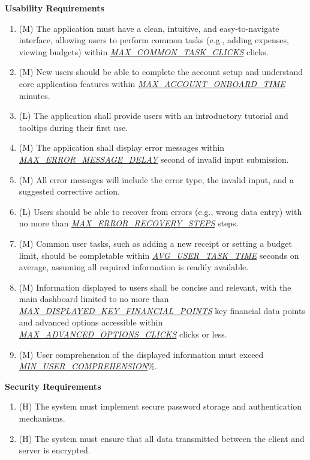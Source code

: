 \documentclass[12pt]{article}
\begin{document}
\textbf{Usability Requirements}
\begin{enumerate}[label=NFR-USAB-\arabic*]
  \item (M) The application must have a clean, intuitive, and easy-to-navigate
  interface, allowing users to perform common tasks (e.g., adding expenses,
  viewing budgets) within
  \hyperref[Table:AuxConstants]{\textit{MAX\_COMMON\_TASK\_CLICKS}} clicks.
  \item (M) New users should be able to complete the account setup and
  understand core application features within
  \hyperref[Table:AuxConstants]{\textit{MAX\_ACCOUNT\_ONBOARD\_TIME}} minutes.
  \item (L) The application shall provide users with an introductory tutorial and
  tooltips during their first use.
  \item (M) The application shall display error messages within
  \hyperref[Table:AuxConstants]{\textit{MAX\_ERROR\_MESSAGE\_DELAY}} second of
  invalid input submission.
  \item (M) All error messages will include the error type, the invalid 
  input, and a suggested corrective action.
  \item (L) Users should be able to recover from errors (e.g., wrong data entry)
  with no more than
  \hyperref[Table:AuxConstants]{\textit{MAX\_ERROR\_RECOVERY\_STEPS}} steps.
  \item (M) Common user tasks, such as adding a new receipt or setting a budget
  limit, should be completable within
  \hyperref[Table:AuxConstants]{\textit{AVG\_USER\_TASK\_TIME}} seconds on
  average, assuming all required information is readily available.
  \item (M) Information displayed to users shall be concise and relevant, with
  the main dashboard limited to no more than
  \hyperref[Table:AuxConstants]{\textit{MAX\_DISPLAYED\_KEY\_FINANCIAL\_POINTS}}
  key financial data points and advanced options accessible within
  \hyperref[Table:AuxConstants]{\textit{MAX\_ADVANCED\_OPTIONS\_CLICKS}} clicks or less.
  \item (M) User comprehension of the displayed information must exceed\\
  \hyperref[Table:AuxConstants]{\textit{MIN\_USER\_COMPREHENSION}}\%.
\end{enumerate}

\textbf{Security Requirements}
\begin{enumerate}[label=NFR-SEC-\arabic*]
  \item (H) The system must implement secure password storage and authentication
  mechanisms.
  \item (H) The system must ensure that all data transmitted between the client and
  server is encrypted.
\end{enumerate}
\end{document}
